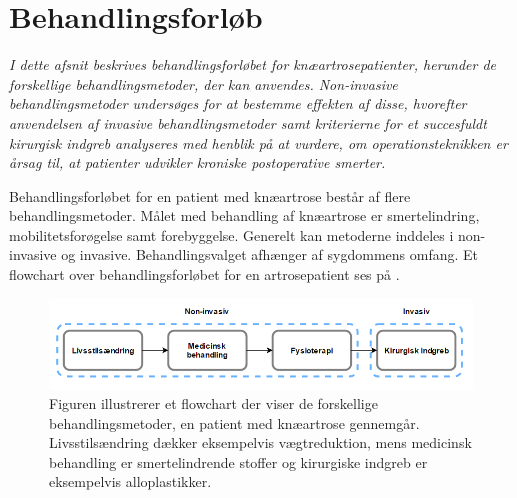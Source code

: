 \section{Behandlingsforløb}
\textit{I dette afsnit beskrives behandlingsforløbet for knæartrosepatienter, herunder de forskellige behandlingsmetoder, der kan anvendes. Non-invasive behandlingsmetoder undersøges for at bestemme effekten af disse, hvorefter anvendelsen af invasive behandlingsmetoder samt kriterierne for et succesfuldt kirurgisk indgreb analyseres med henblik på at vurdere, om operationsteknikken er årsag til, at patienter udvikler kroniske postoperative smerter.}

Behandlingsforløbet for en patient med knæartrose består af flere behandlingsmetoder. Målet med behandling af knæartrose er smertelindring, mobilitetsforøgelse samt forebyggelse. Generelt kan metoderne inddeles i non-invasive og invasive. Behandlingsvalget afhænger af sygdommens omfang. \citep{Lind2016b} Et flowchart over behandlingsforløbet for en artrosepatient ses på . 

\begin{figure}[H]
	\centering
	\includegraphics[width=1\textwidth]{figures/bProblemanalyse/flowchart_behandlingsforloeb_rettet.png}
	\caption{Figuren illustrerer et flowchart der viser de forskellige behandlingsmetoder, en patient med knæartrose gennemgår. Livsstilsændring dækker eksempelvis vægtreduktion, mens medicinsk behandling er smertelindrende stoffer og kirurgiske indgreb er eksempelvis alloplastikker. \citep{Lind2016b}}
	\label{fig:flow_behandlingsfaser}
\end{figure}\vspace{-.25cm}


